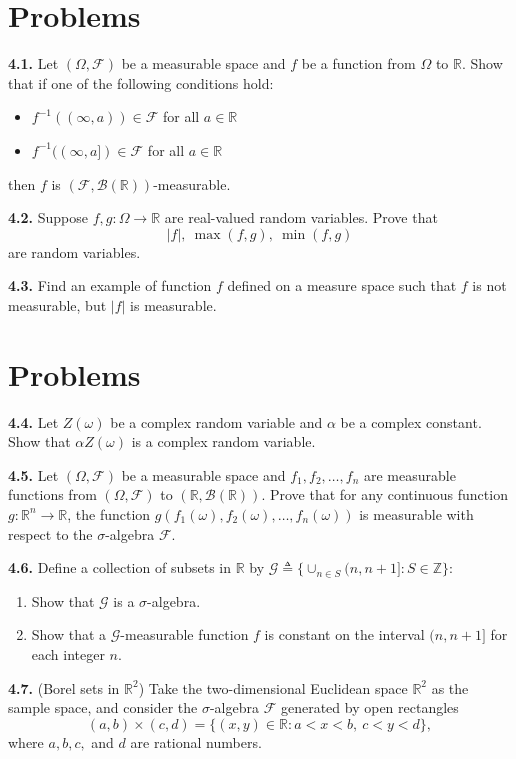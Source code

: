 \section*{Problems}

\textbf{4.1.} Let $(\Omega, \mathcal{F})$ be a measurable space and $f$ be a function from $\Omega$ to $\mathbb{R}$. Show that if one of the following conditions hold:
\begin{itemize}
    \item $f^{-1}((\infty, a)) \in \mathcal{F}$ for all $a \in \mathbb{R}$
    \item $f^{-1}((\infty, a]) \in \mathcal{F}$ for all $a \in \mathbb{R}$
\end{itemize}
then $f$ is $(\mathcal{F}, \mathcal{B}(\mathbb{R}))$-measurable.

\textbf{4.2.} Suppose $f, g : \Omega \to \mathbb{R}$ are real-valued random variables. Prove that
\[
|f|, \ \max(f, g), \ \min(f, g)
\]
are random variables.

\textbf{4.3.} Find an example of function $f$ defined on a measure space such that $f$ is not measurable, but $|f|$ is measurable.
\section*{Problems}

\textbf{4.4.} Let $Z(\omega)$ be a complex random variable and $\alpha$ be a complex constant. Show that $\alpha Z(\omega)$ is a complex random variable.

\textbf{4.5.} Let $(\Omega, \mathcal{F})$ be a measurable space and $f_1, f_2, \dots, f_n$ are measurable functions from $(\Omega, \mathcal{F})$ to $(\mathbb{R}, \mathcal{B}(\mathbb{R}))$. Prove that for any continuous function $g : \mathbb{R}^n \to \mathbb{R}$, the function $g(f_1(\omega), f_2(\omega), \dots, f_n(\omega))$ is measurable with respect to the $\sigma$-algebra $\mathcal{F}$.

\textbf{4.6.} Define a collection of subsets in $\mathbb{R}$ by $\mathcal{G} \triangleq \{\cup_{n \in S} (n, n+1] : S \in \mathbb{Z}\}$:
\begin{enumerate}[label=(\alph*)]
    \item Show that $\mathcal{G}$ is a $\sigma$-algebra.
    \item Show that a $\mathcal{G}$-measurable function $f$ is constant on the interval $(n, n+1]$ for each integer $n$.
\end{enumerate}

\textbf{4.7.} (Borel sets in $\mathbb{R}^2$) Take the two-dimensional Euclidean space $\mathbb{R}^2$ as the sample space, and consider the $\sigma$-algebra $\mathcal{F}$ generated by open rectangles
\[
(a, b) \times (c, d) = \{(x, y) \in \mathbb{R} : a < x < b, \ c < y < d\},
\]
where $a, b, c,$ and $d$ are rational numbers.

